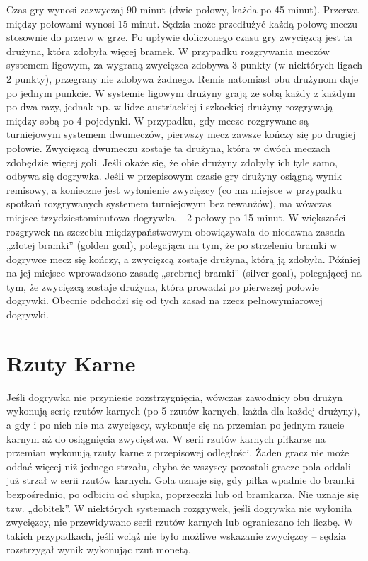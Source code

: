 \documentclass[14pt,oneside,a4paper]{book}
\theoremstyle{break}
\begin{document}
Czas gry wynosi zazwyczaj 90 minut (dwie połowy, każda po 45 minut). Przerwa między połowami wynosi 15 minut. Sędzia może przedłużyć każdą połowę meczu stosownie do przerw w grze. Po upływie doliczonego czasu gry zwycięzcą jest ta drużyna, która zdobyła więcej bramek. W przypadku rozgrywania meczów systemem ligowym, za wygraną zwycięzca zdobywa 3 punkty (w niektórych ligach 2 punkty), przegrany nie zdobywa żadnego. Remis natomiast obu drużynom daje po jednym punkcie. W systemie ligowym drużyny grają ze sobą każdy z każdym po dwa razy, jednak np. w lidze austriackiej i szkockiej drużyny rozgrywają między sobą po 4 pojedynki.
W przypadku, gdy mecze rozgrywane są turniejowym systemem dwumeczów, pierwszy mecz zawsze kończy się po drugiej połowie. Zwycięzcą dwumeczu zostaje ta drużyna, która w dwóch meczach zdobędzie więcej goli. Jeśli okaże się, że obie drużyny zdobyły ich tyle samo, odbywa się dogrywka.
	Jeśli w przepisowym czasie gry drużyny osiągną wynik remisowy, a konieczne jest wyłonienie zwycięzcy (co ma miejsce w przypadku spotkań rozgrywanych systemem turniejowym bez rewanżów), ma wówczas miejsce trzydziestominutowa dogrywka – 2 połowy po 15 minut. W większości rozgrywek na szczeblu międzypaństwowym obowiązywała do niedawna zasada „złotej bramki” (golden goal), polegająca na tym, że po strzeleniu bramki w dogrywce mecz się kończy, a zwycięzcą zostaje drużyna, którą ją zdobyła. Później na jej miejsce wprowadzono zasadę „srebrnej bramki” (silver goal), polegającej na tym, że zwycięzcą zostaje drużyna, która prowadzi po pierwszej połowie dogrywki. Obecnie odchodzi się od tych zasad na rzecz pełnowymiarowej dogrywki.

\section {Rzuty Karne}

Jeśli dogrywka nie przyniesie rozstrzygnięcia, wówczas zawodnicy obu drużyn wykonują serię rzutów karnych (po 5 rzutów karnych, każda dla każdej drużyny), a gdy i po nich nie ma zwycięzcy, wykonuje się na przemian po jednym rzucie karnym aż do osiągnięcia zwycięstwa. W serii rzutów karnych piłkarze na przemian wykonują rzuty karne z przepisowej odległości. Żaden gracz nie może oddać więcej niż jednego strzału, chyba że wszyscy pozostali gracze pola oddali już strzał w serii rzutów karnych. Gola uznaje się, gdy piłka wpadnie do bramki bezpośrednio, po odbiciu od słupka, poprzeczki lub od bramkarza. Nie uznaje się tzw. „dobitek”.
W niektórych systemach rozgrywek, jeśli dogrywka nie wyłoniła zwycięzcy, nie przewidywano serii rzutów karnych lub ograniczano ich liczbę. W takich przypadkach, jeśli wciąż nie było możliwe wskazanie zwycięzcy – sędzia rozstrzygał wynik wykonując rzut monetą.
\end{document}
